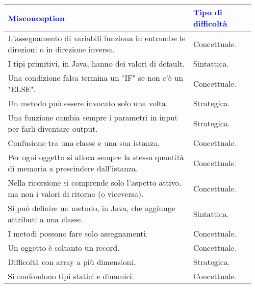 \begin{center}
    \begin{tabular}{ || >{\columncolor{mgray}}p{10.5cm} | p{5.5cm} ||}
    \hline\hline
    \rowcolor{lightgray}
    \textbf{\textcolor{blue}{Misconception}} & \textbf{\textcolor{blue}{Tipo di difficoltà}} \\ \hline
        
        L'assegnamento di variabili funziona in entrambe le direzioni o in direzione inversa. & Concettuale. \\\hline
        
        I tipi primitivi, in Java, hanno dei valori di default. & Sintattica. \\\hline
    
        Una condizione falsa termina un "IF" se non c'è un "ELSE". & Concettuale. \\\hline
    
        Un metodo può essere invocato solo una volta. & Strategica. \\\hline

        Una funzione cambia sempre i parametri in input per farli diventare output. & Strategica. \\\hline

        Confusione tra una classe e una sua istanza. & Concettuale. \\\hline

        Per ogni oggetto si alloca sempre la stessa quantità di memoria a prescindere dall'istanza. & Concettuale. \\\hline

        Nella ricorsione si comprende solo l'aspetto attivo, ma non i valori di ritorno
        (o viceversa). & Concettuale. \\\hline

        Si può definire un metodo, in Java, che aggiunge attributi a una classe. & Sintattica. \\\hline

        I metodi possono fare solo assegnamenti. & Concettuale. \\\hline

        Un oggetto è soltanto un record. & Concettuale. \\\hline

        Difficoltà con array a più dimensioni. & Strategica. \\\hline

        Si confondono tipi statici e dinamici. & Concettuale. \\\hline


\end{tabular}
\end{center}
